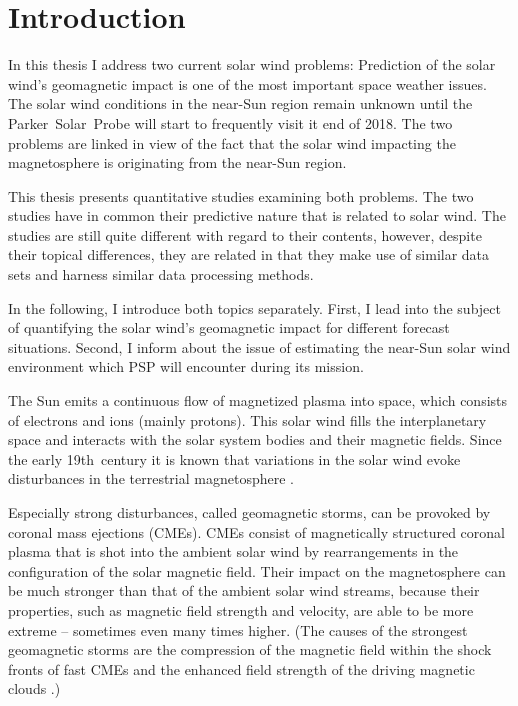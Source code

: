 
\chapter{Introduction}
\label{chap:introduction}


In this thesis I address two current solar wind problems: Prediction of the solar wind's geomagnetic impact is one of the most important space weather issues. The solar wind conditions in the near-Sun region remain unknown until the Parker~Solar~Probe will start to frequently visit it end of 2018. The two problems are linked in view of the fact that the solar wind impacting the magnetosphere is originating from the near-Sun region.

This thesis presents quantitative studies examining both problems. The two studies have in common their predictive nature that is related to solar wind. The studies are still quite different with regard to their contents, however, despite their topical differences, they are related in that they make use of similar data sets and harness similar data processing methods.

In the following, I introduce both topics separately. First, I lead into the subject of quantifying the solar wind's geomagnetic impact for different forecast situations. Second, I inform about the issue of estimating the near-Sun solar wind environment which PSP will encounter during its mission.

\bigskip


The Sun emits a continuous flow of magnetized plasma into space, which consists of electrons and ions (mainly protons). This solar wind fills the interplanetary space and interacts with the solar system bodies and their magnetic fields. Since the early 19th~century it is known that variations in the solar wind evoke disturbances in the terrestrial magnetosphere \citep{Bartels1962}.

Especially strong disturbances, called geomagnetic storms, can be provoked by coronal mass ejections (CMEs). CMEs consist of magnetically structured coronal plasma that is shot into the ambient solar wind by rearrangements in the configuration of the solar magnetic field. Their impact on the magnetosphere can be much stronger than that of the ambient solar wind streams, because their properties, such as magnetic field strength and velocity, are able to be more extreme -- sometimes even many times higher.
(The causes of the strongest geomagnetic storms are the compression of the magnetic field within the shock fronts of fast CMEs and the enhanced field strength of the driving magnetic clouds \citep{Bothmer1995}.)

